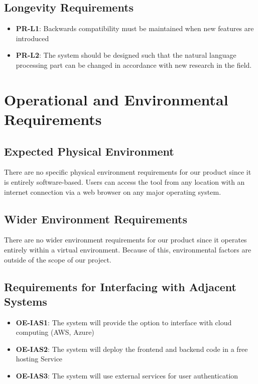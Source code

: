 \documentclass[12pt]{article}
\begin{document}
\subsection{Longevity Requirements}
\begin{itemize}
    \item \textbf{PR-L1}: Backwards compatibility must be maintained when new features are introduced
    \item \textbf{PR-L2}: The system should be designed such that the natural language processing part can be changed in accordance with new research in the field.
\end{itemize}

\section{Operational and Environmental Requirements}
\subsection{Expected Physical Environment}
There are no specific physical environment requirements for our product since it is entirely software-based.
Users can access the tool from any location with an internet connection via a web browser on any major operating system.

\subsection{Wider Environment Requirements}
There are no wider environment requirements for our product since it operates entirely within a virtual environment.
Because of this, environmental factors are outside of the scope of our project.

\subsection{Requirements for Interfacing with Adjacent Systems}
\begin{itemize}
    \item \textbf{OE-IAS1}: The system will provide the option to interface with cloud computing (AWS, Azure) 
    \item \textbf{OE-IAS2}: The system will deploy the frontend and backend code in a free hosting Service
    \item \textbf{OE-IAS3}: The system will use external services for user authentication 
\end{itemize}
\end{document}
